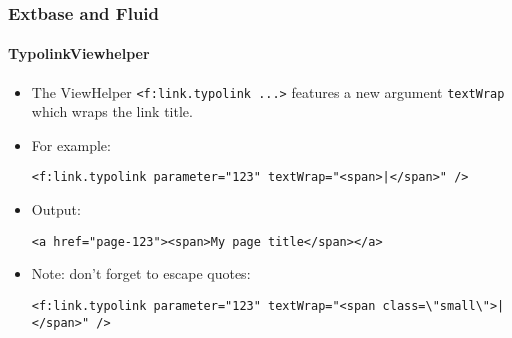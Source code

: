 %

\begin{frame}[fragile]
	\frametitle{Extbase and Fluid}
	\framesubtitle{TypolinkViewhelper}


	\begin{itemize}
		\item The ViewHelper \texttt{<f:link.typolink ...>} features a new argument
			\texttt{textWrap} which wraps the link title.

		\item For example:
\begin{lstlisting}
<f:link.typolink parameter="123" textWrap="<span>|</span>" />
\end{lstlisting}

		\item Output:
\begin{lstlisting}
<a href="page-123"><span>My page title</span></a>
\end{lstlisting}

		\item Note: don't forget to escape quotes:
\begin{lstlisting}
<f:link.typolink parameter="123" textWrap="<span class=\"small\">|</span>" />
\end{lstlisting}

	\end{itemize}

\end{frame}

